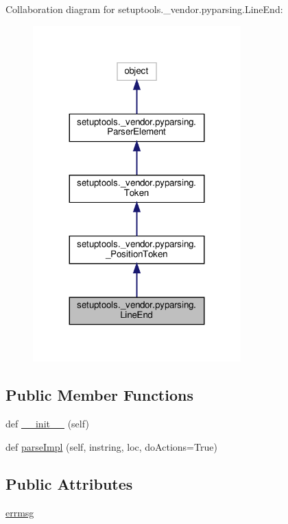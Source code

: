 Collaboration diagram for setuptools.\+\_\+vendor.\+pyparsing.\+Line\+End\+:
\nopagebreak
\begin{figure}[H]
\begin{center}
\leavevmode
\includegraphics[width=227pt]{classsetuptools_1_1__vendor_1_1pyparsing_1_1LineEnd__coll__graph}
\end{center}
\end{figure}
\subsection*{Public Member Functions}
\begin{DoxyCompactItemize}
\item 
def \hyperlink{classsetuptools_1_1__vendor_1_1pyparsing_1_1LineEnd_a30f30dad80c5899ee902627b2c1e402c}{\+\_\+\+\_\+init\+\_\+\+\_\+} (self)
\item 
def \hyperlink{classsetuptools_1_1__vendor_1_1pyparsing_1_1LineEnd_ad02d3a244791f44da87eb59efbfdaa91}{parse\+Impl} (self, instring, loc, do\+Actions=True)
\end{DoxyCompactItemize}
\subsection*{Public Attributes}
\begin{DoxyCompactItemize}
\item 
\hyperlink{classsetuptools_1_1__vendor_1_1pyparsing_1_1LineEnd_a17e435f83fa54c889ae9082c86e23280}{errmsg}
\end{DoxyCompactItemize}
